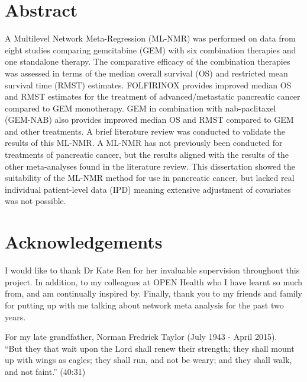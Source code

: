 \documentclass[10pt]{report}
\begin{document}


%

\section*{Abstract}
A Multilevel Network Meta-Regression (ML-NMR) was performed on data from eight studies comparing gemcitabine (GEM) with six combination therapies and one standalone therapy. The comparative efficacy of the combination therapies was assessed in terms of the median overall survival (OS) and restricted mean survival time (RMST) estimates. FOLFIRINOX provides improved median OS and RMST estimates for the treatment of advanced/metastatic pancreatic cancer compared to GEM monotherapy. GEM in combination with nab-paclitaxel (GEM-NAB) also provides improved median OS and RMST compared to GEM and other treatments. 
A brief literature review was conducted to validate the results of this ML-NMR. A ML-NMR has not previously been conducted for treatments of pancreatic cancer, but the results aligned with the results of the other meta-analyses found in the literature review. This dissertation showed the suitability of the ML-NMR method for use in pancreatic cancer, but lacked real individual patient-level data (IPD) meaning extensive adjustment of covariates was not possible.

\section*{Acknowledgements}
I would like to thank Dr Kate Ren for her invaluable supervision throughout this project. In addition, to my colleagues at OPEN Health who I have learnt so much from, and am continually inspired by. Finally, thank you to my friends and family for putting up with me talking about network meta analysis for the past two years.

\clearpage
\begin{center}
  \thispagestyle{empty}
  \vspace*{\fill}
  For my late grandfather, Norman Fredrick Taylor (July 1943 - April 2015).\\
  ``But they that wait upon the Lord shall renew their strength; they shall mount up with wings as eagles; they shall run, and not be weary; and they shall walk, and not faint.'' (40:31)
  \vspace*{\fill}
\end{center}
\end{document}

